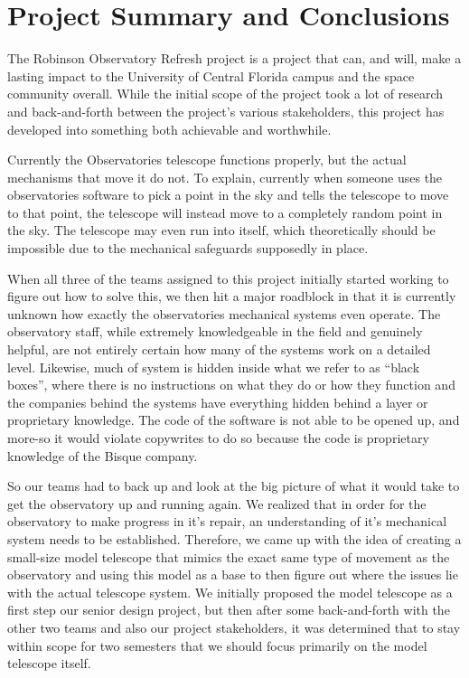 \documentclass[12pt]{report}
\begin{document}
\section*{Project Summary and Conclusions}

The Robinson Observatory Refresh project is a project that can, and will, make a lasting impact to the University of Central Florida campus and the space community overall. While the initial scope of the project took a lot of research and back-and-forth between the project’s various stakeholders, this project has developed into something both achievable and worthwhile.

Currently the Observatories telescope functions properly, but the actual mechanisms that move it do not. To explain, currently when someone uses the observatories software to pick a point in the sky and tells the telescope to move to that point, the telescope will instead move to a completely random point in the sky. The telescope may even run into itself, which theoretically should be impossible due to the mechanical safeguards supposedly in place.

When all three of the teams assigned to this project initially started working to figure out how to solve this, we then hit a major roadblock in that it is currently unknown how exactly the observatories mechanical systems even operate. The observatory staff, while extremely knowledgeable in the field and genuinely helpful, are not entirely certain how many of the systems work on a detailed level. Likewise, much of system is hidden inside what we refer to as “black boxes”, where there is no instructions on what they do or how they function and the companies behind the systems have everything hidden behind a layer or proprietary knowledge. The code of the software is not able to be opened up, and more-so it would violate copywrites to do so because the code is proprietary knowledge of the Bisque company.

So our teams had to back up and look at the big picture of what it would take to get the observatory up and running again. We realized that in order for the observatory to make progress in it’s repair, an understanding of it’s mechanical system needs to be established. Therefore, we came up with the idea of creating a small-size model telescope that mimics the exact same type of movement as the observatory and using this model as a base to then figure out where the issues lie with the actual telescope system. We initially proposed the model telescope as a first step our senior design project, but then after some back-and-forth with the other two teams and also our project stakeholders, it was determined that to stay within scope for two semesters that we should focus primarily on the model telescope itself.
\end{document}
